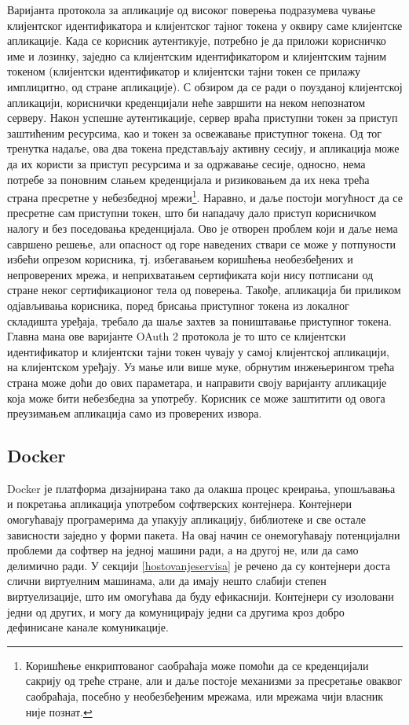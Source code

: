 \documentclass[12pt,oneside]{memoir}
\begin{document}
Варијанта протокола за апликације од високог поверења подразумева чување клијентског идентификатора и клијентског тајног токена у оквиру саме клијентске апликације. Када се корисник аутентикује, потребно је да приложи корисничко име и лозинку, заједно са клијентским идентификатором и клијентским тајним токеном (клијентски идентификатор и клијентски тајни токен се прилажу имплицитно, од стране апликације). С обзиром да се ради о поузданој клијентској апликацији, кориснички креденцијали неће завршити на неком непознатом серверу. Након успешне аутентикације, сервер враћа приступни токен за приступ заштићеним ресурсима, као и токен за освежавање приступног токена. Од тог тренутка надаље, ова два токена представљају активну сесију, и апликација може да их користи за приступ ресурсима и за одржавање сесије, односно, нема потребе за поновним слањем креденцијала и ризиковањем да их нека трећа страна пресретне у небезбедној мрежи\footnote{Коришћење енкриптованог саобраћаја може помоћи да се креденцијали сакрију од треће стране, али и даље постоје механизми за пресретање оваквог саобраћаја, посебно у необезбеђеним мрежама, или мрежама чији власник није познат.}. Наравно, и даље постоји могућност да се пресретне сам приступни токен, што би нападачу дало приступ корисничком налогу и без поседовања креденцијала. Ово је отворен проблем који и даље нема савршено решење, али опасност од горе наведених ствари се може у потпуности избећи опрезом корисника, тј. избегавањем коришћења необезбеђених и непроверених мрежа, и неприхватањем сертификата који нису потписани од стране неког сертификационог тела од поверења. Такође, апликација би приликом одјављивања корисника, поред брисања приступног токена из локалног складишта уређаја, требало да шаље захтев за поништавање приступног токена. Главна мана ове варијанте OAuth 2 протокола је то што се клијентски идентификатор и клијентски тајни токен чувају у самој клијентској апликацији, на клијентском уређају. Уз мање или више муке, обрнутим инжењерингом трећа страна може доћи до ових параметара, и направити своју варијанту апликације која може бити небезбедна за употребу. Корисник се може заштитити од овога преузимањем апликација само из проверених извора.

\subsection{Docker}
Docker је платформа дизајнирана тако да олакша процес креирања, упошљавања и покретања апликација употребом софтверских контејнера. Контејнери омогућавају програмерима да упакују апликацију, библиотеке и све остале зависности заједно у форми пакета. На овај начин се онемогућавају потенцијални проблеми да софтвер на једној машини ради, а на другој не, или да само делимично ради. У секцији \ref{hostovanjeservisa} је речено да су контејнери доста слични виртуелним машинама, али да имају нешто слабији степен виртуелизације, што им омогућава да буду ефикаснији. Контејнери су изоловани једни од других, и могу да комуницирају једни са другима кроз добро дефинисане канале комуникације.
\end{document}
